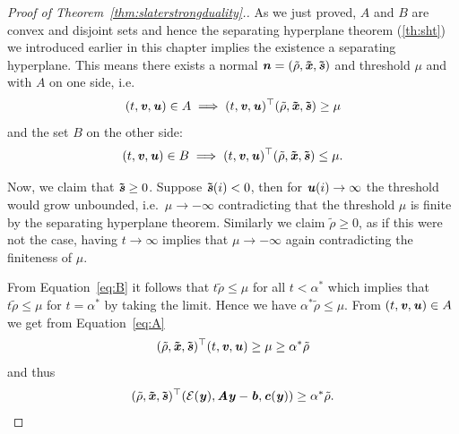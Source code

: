 \begin{proof}[Proof of Theorem~\ref{thm:slaterstrongduality}.]
As we just proved, $A$ and $B$ are convex and disjoint sets and hence the separating hyperplane theorem (\autoref{th:sht}) we introduced earlier in this chapter implies the existence a separating hyperplane.
This means there exists a normal
$\boldsymbol{\mathit{n}} = (\tilde\rho, \boldsymbol{\tilde{\mathit{x}}}, \boldsymbol{\tilde{\mathit{s}}})$ and threshold
$\mu$ and with $A$ on one side, i.e.\
\begin{equation} \label{eq:A}
(t, \boldsymbol{\mathit{v}}, \boldsymbol{\mathit{u}}) \in A \implies (t, \boldsymbol{\mathit{v}}, \boldsymbol{\mathit{u}})^{\top}(\tilde\rho, \boldsymbol{\tilde{\mathit{x}}}, \boldsymbol{\tilde{\mathit{s}}}) \geq \mu
\end{equation}
and the set $B$ on the other side:
\begin{equation} \label{eq:B}
(t, \boldsymbol{\mathit{v}}, \boldsymbol{\mathit{u}}) \in B \implies (t, \boldsymbol{\mathit{v}}, \boldsymbol{\mathit{u}})^{\top}(\tilde\rho, \boldsymbol{\tilde{\mathit{x}}}, \boldsymbol{\tilde{\mathit{s}}}) \leq \mu.
\end{equation}

Now, we claim that $\boldsymbol{\tilde{\mathit{s}}} \geq 0$. Suppose $\boldsymbol{\tilde{\mathit{s}}}(i) < 0$, then for $\boldsymbol{\mathit{u}}(i) \rightarrow \infty$ the threshold would grow unbounded, i.e.\ $\mu \rightarrow -\infty$ contradicting that the threshold $\mu$ is finite by the separating hyperplane theorem.
Similarly we claim $\tilde\rho \geq 0$, as if this were not the case, having $t \rightarrow \infty$ implies that $\mu \rightarrow -\infty$ again contradicting the finiteness of $\mu$.

From Equation~\eqref{eq:B} it follows that $t\tilde\rho \leq \mu$ for all $t < \alpha^*$ which implies that $t\tilde\rho \leq \mu$ for $t = \alpha^*$ by taking the limit. Hence we have $\alpha^*\tilde\rho \leq \mu$.
From $(t, \boldsymbol{\mathit{v}}, \boldsymbol{\mathit{u}}) \in A$ we get from  Equation~\eqref{eq:A}
\begin{equation*}
(\tilde\rho, \boldsymbol{\tilde{\mathit{x}}}, \boldsymbol{\tilde{\mathit{s}}})^{\top}(t, \boldsymbol{\mathit{v}}, \boldsymbol{\mathit{u}}) \geq \mu \geq \alpha^*\tilde\rho
\end{equation*}
and thus
\begin{equation}\label{eq:rhotilde}
(\tilde\rho, \boldsymbol{\tilde{\mathit{x}}}, \boldsymbol{\tilde{\mathit{s}}})^{\top}(\mathcal{E}(\boldsymbol{\mathit{y}}), \boldsymbol{\mathit{A}}\boldsymbol{\mathit{y}}-\boldsymbol{\mathit{b}},\boldsymbol{\mathit{c}}(\boldsymbol{\mathit{y}})) \geq \alpha^*\tilde\rho.
\end{equation}



\end{proof}
